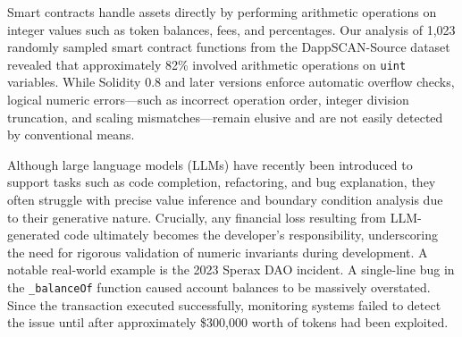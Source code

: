 \documentclass[10pt, conference]{IEEEtran}
\begin{document}

Smart contracts handle assets directly by performing arithmetic operations on integer values such as token balances, fees, and percentages.  
Our analysis of 1,023 randomly sampled smart contract functions from the DappSCAN-Source dataset revealed that approximately 82\% involved arithmetic operations on \texttt{uint} variables.  
While Solidity 0.8 and later versions enforce automatic overflow checks, logical numeric errors—such as incorrect operation order, integer division truncation, and scaling mismatches—remain elusive and are not easily detected by conventional means.  

Although large language models (LLMs) have recently been introduced to support tasks such as code completion, refactoring, and bug explanation, they often struggle with precise value inference and boundary condition analysis due to their generative nature.  
Crucially, any financial loss resulting from LLM-generated code ultimately becomes the developer’s responsibility, underscoring the need for rigorous validation of numeric invariants during development.  
A notable real-world example is the 2023 Sperax DAO incident.  
A single-line bug in the \texttt{\_balanceOf} function caused account balances to be massively overstated.  
Since the transaction executed successfully, monitoring systems failed to detect the issue until after approximately \$300,000 worth of tokens had been exploited.
\end{document}
